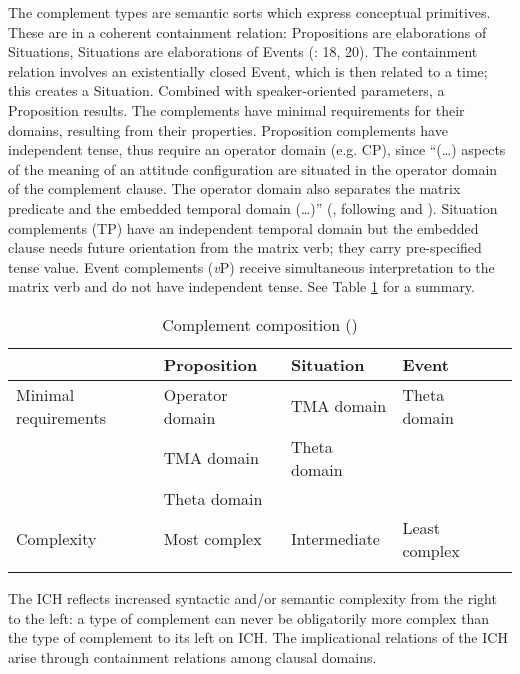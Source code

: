 \documentclass[output=paper]{langscibook}
\begin{document}
The complement types are semantic sorts which express conceptual primitives. These are in a coherent containment relation: Propositions are elaborations of Situations, Situations are elaborations of Events (\citealt{ramchandsvenonius2014}: 18, 20). The containment relation involves an existentially closed Event, which is then related to a time; this creates a Situation. Combined with speaker-oriented parameters, a Proposition results. The complements have minimal requirements for their domains, resulting from their properties. Proposition complements have independent tense, thus require an operator domain (e.g. CP), since “(…) aspects of the meaning of an attitude configuration are situated in the operator domain of the complement clause. The operator domain also separates the matrix predicate and the embedded temporal domain (…)” (\citealt{wurmbrandlohninger2020}, following \citealt{kratzer2006} and \citealt{moultonnodatenat,moultonnodatecomp}). Situation complements (TP) have an independent temporal domain but the embedded clause needs future orientation from the matrix verb; they carry pre-specified tense value. Event complements (\emph{v}P) receive simultaneous interpretation to the matrix verb and do not have independent tense. See Table \ref{Pajtab3} for a summary.\largerpage

\begin{table}
\caption{Complement composition (\citealt{wurmbrandlohninger2020})}
\label{Pajtab3}
 \begin{tabular}{l llll}
  \lsptoprule
            & Proposition & Situation  & Event \\
  \midrule
  Minimal requirements  &   Operator domain  &    TMA domain  &    Theta domain    \\
                         & TMA domain & Theta domain  &        \\
                         & Theta domain &   &        \\
  Complexity  &   Most complex &   Intermediate  &    Least complex    \\
  \lspbottomrule
 \end{tabular}
\end{table}

\begin{exe}
\ex \label{Paj4} \citet{wurmbrandlohninger2020} 
\begin{xlist}
\ex \label{Paj4a}
The ICH reflects increased syntactic and/or semantic complexity from the right to the left: a type of complement can never be obligatorily more complex than the type of complement to its left on ICH. 
\ex \label{Paj4b}
The implicational relations of the ICH arise through containment relations among clausal domains.
\end{xlist}
\end{exe}
\end{document}
